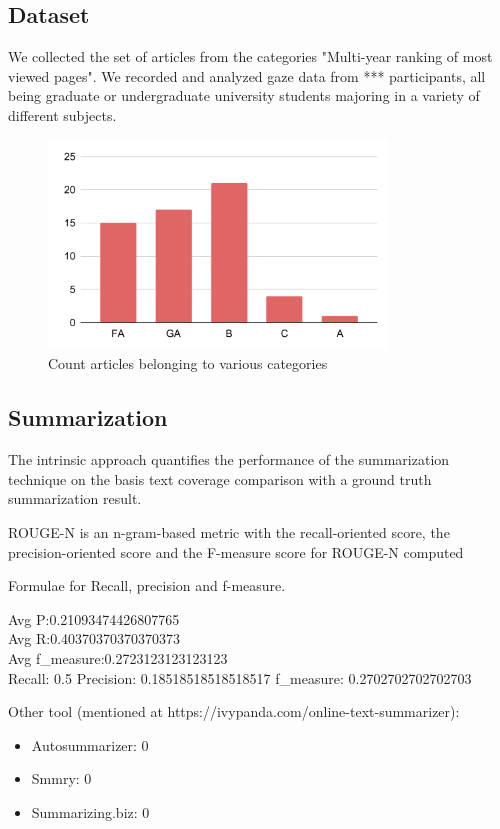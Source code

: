 \documentclass[12pt]{article}
\begin{document}
\subsection{Dataset}

We collected the set of articles from the categories "Multi-year ranking of most viewed pages". We recorded and analyzed gaze data from *** participants, all being graduate or undergraduate university students 
majoring in a variety of different subjects.


\begin{figure}[!htb]
    \center \includegraphics[width= 9cm]{images/article_category.pdf}
    \caption{\label{fig:article_category} Count articles belonging to various categories}
\end{figure}


\subsection{Summarization}
The intrinsic approach quantifies the performance of the summarization technique on the basis text coverage comparison with a ground truth summarization result. 

ROUGE-N is an n-gram-based metric with
the recall-oriented score, the precision-oriented score and the F-measure score for ROUGE-N
computed

Formulae for Recall, precision and f-measure.




Avg P:0.21093474426807765\\
Avg R:0.40370370370370373\\
Avg f\_measure:0.2723123123123123\\

Recall: 0.5
Precision: 0.18518518518518517
f\_measure: 0.2702702702702703

Other tool (mentioned at https://ivypanda.com/online-text-summarizer):\\
\begin{itemize}
\item Autosummarizer: 0
\item Smmry: 0
\item Summarizing.biz: 0
\end{itemize}
\end{document}
